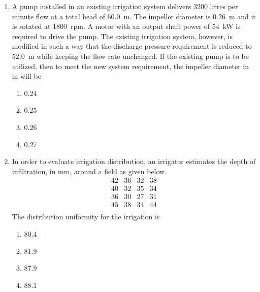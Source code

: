 \documentclass[journal]{IEEEtran}
\numberwithin{equation}{enumi}
\numberwithin{figure}{enumi}
\begin{document}
\begin{enumerate}
The friction factor, \(f\), for all pipes is 0.030. The ratio of flow in pipes X and Y is
      
\begin{multicols}{4}
    \begin{enumerate}
    \item 0.36 
    \item 0.44
    \item 0.67 
    \item 1.00
    \end{enumerate}
    \end{multicols}  

    
    \item A pump installed in an existing irrigation system delivers 3200 litres per minute flow at a total head of 60.0~m. The impeller diameter is 0.26~m and it is rotated at 1800~rpm. A motor with an output shaft power of 54~kW is required to drive the pump. The existing irrigation system, however, is modified in such a way that the discharge pressure requirement is reduced to 52.0~m while keeping the flow rate unchanged. If the existing pump is to be utilized, then to meet the new system requirement, the impeller diameter in m will be
     \hfill{}
\begin{multicols}{4}
    \begin{enumerate}
    \item 0.24
    \item 0.25
    \item  0.26
    \item  0.27
    \end{enumerate}
    \end{multicols}  



\item
In order to evaluate irrigation distribution, an irrigator estimates the depth of infiltration, in mm, around a field as given below.
\[
\begin{array}{cccc}
42 & 36 & 32 & 38 \\
40 & 32 & 35 & 34 \\
36 & 30 & 27 & 31 \\
45 & 38 & 34 & 44 \\
\end{array}
\]
The distribution uniformity for the irrigation is
\hfill{}
\begin{multicols}{4}
    \begin{enumerate}
    \item 80.4
    \item 81.9 
    \item 87.9
    \item 88.1
    \end{enumerate}
    \end{multicols}  





\end{enumerate}
\end{document}

